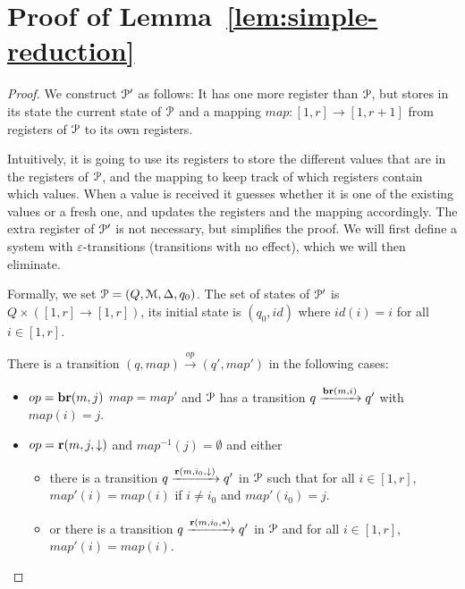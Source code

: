 \section{Proof of Lemma~\ref{lem:simple-reduction}}
\label{sec:proof-simple}

\SimpleReduction*

\ifproofs
\begin{proof}
	
	We construct $\mathcal{P}'$ as follows: It has one more register than $\mathcal{P}$, but stores in its state the current state of $\mathcal{P}$ and a mapping $map : [1,r] \to [1,r+1]$ from registers of $\mathcal{P}$ to its own registers.
	
	Intuitively, it is going to use its registers to store the different values that are in the registers of $\mathcal{P}$, and the mapping to keep track of which registers contain which values.
	When a value is received it guesses whether it is one of the existing values or a fresh one, and updates the registers and the mapping accordingly.
	The extra register of $\mathcal{P}'$ is not necessary, but simplifies the proof.
	We will first define a system with $\varepsilon$-transitions (transitions with no effect), which we will then eliminate. 
	
	
	Formally, we set $\mathcal{P} = (Q, \mathcal{M}, \Delta, q_0)$.
	The set of states of $\mathcal{P}'$ is $Q \times ([1,r] \to [1,r])$, its initial state is $(q_0, id)$ where $id(i) = i$ for all $i \in [1,r]$. 
	
	There is a transition $(q, map) \xrightarrow{op} (q', map')$ in the following cases:
	
	\begin{itemize}
		\item $op = \textbf{br}(m, j)$ 
		$map = map'$ and $\mathcal{P}$ has a transition $q \xrightarrow{\textbf{br}(m, i)} q'$ with $map(i)=j$.
		
		\item $op=\textbf{r}(m, j, \downarrow)$ and $map^{-1}(j) =\emptyset$ and either
		\begin{itemize}
			\item there is a transition $q \xrightarrow{\textbf{r}(m, i_0, \downarrow)} q'$ in $\mathcal{P}$ such that for all $i \in [1,r]$, $map'(i) = map(i)$ if $i \neq i_0$ and $map'(i_0) = j$.
			
			\item or there is a transition $q \xrightarrow{\textbf{r}(m, i_0, {*})} q'$ in $\mathcal{P}$ and for all $i \in [1,r]$, $map'(i) = map(i)$.
		\end{itemize}
		

\end{itemize}
\end{proof}
